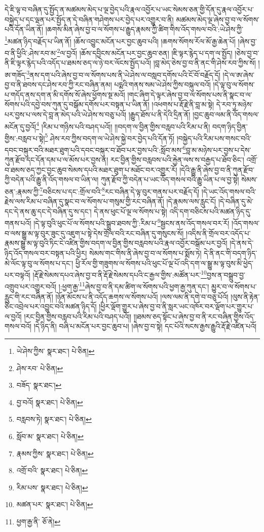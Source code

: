 དེ་ཇི་ལྟ་བ་བཞིན་དུ་སྤྱོད་ན་མཚམས་མེད་པ་ལྔ་བྱེད་པའི་རྣལ་འབྱོར་པ་ཡང་སེམས་ཅན་གྱི་དོན་དུ་རྣལ་འབྱོར་པ་བསྐྱེད་པ་དང་ལྡན་པར་སྤྱོད་ན་དེ་བཞིན་གཤེགས་པར་བྱེད་པར་འགྱུར་བ་ནི། མཚམས་མེད་ལྔ་ཞེས་བྱ་བ་ལ་སོགས་པའི་དོན་ཡིན་ནོ། །ཆགས་མིན་ཞེས་བྱ་བ་ལ་སོགས་པ་རྒྱུད་རྣམས་ཀྱི་ཚིག་གིས་འོད་གསལ་བའི་:ཡེ་ཤེས་ཀྱི་\footnote{ཡེ་ཤེས་ཀྱིས་  སྣར་ཐང་།  པེ་ཅིན། }མཚན་ཉིད་བརྗོད་པ་ཡིན་ནོ། །ཆོས་འབྱུང་མངོན་པར་བྱང་ཆུབ་པའི། །ཆགས་སོགས་རོལ་མོ་རྒྱ་ཆེན་པོ། །ཞེས་བྱ་བ་ནི་ཕྱིའི་:ཤེས་རབ་མ་\footnote{ཤེས་རབ་  པེ་ཅིན། }ལ་བྱའོ། །ཆོས་དབྱིངས་མངོན་པར་བྱང་ཆུབ་ཅན། །ཇི་ལྟར་རྙེད་པ་དག་ལ་སྤྱོད། །ཅེས་བྱ་བ་ནི་ཇི་ལྟར་རྙེད་པའི་འདོད་པ་ཐམས་ཅད་ལ་ཉེ་བར་ལོངས་སྤྱོད་པའོ། །བླ་མེད་ཅེས་བྱ་བ་ནི་ནང་གི་ཤེས་རབ་ཀྱིས་སོ། །ཨ་གཟོད་\footnote{བཟོད་  སྣར་ཐང་། }ནས་དག་པའི་ཞེས་བྱ་བ་ལ་སོགས་པས་ནི་ཡེ་ཤེས་ལ་བསླབ་དགོས་པའི་ངོ་བོ་བརྗོད་དོ། །དེ་ལ་ཨ་ཞེས་བྱ་བ་ནི་ཐབས་དང་ཤེས་རབ་ཀྱི་རང་བཞིན་ནམ། པདྨའི་གནས་སམ་ཡེ་ཤེས་ཀྱིས་བསྐུལ་བའོ། །དེ་ལྟ་བུ་ལ་སོགས་པ་གདོད་ནས་དག་ན་མི་དགོས་སོ་ཞེས་ཕྱོགས་སྔ་མའོ། །གང་ཞིག་དེ་ལྟར་ཞེས་བྱ་བ་ལ་སོགས་པས་ནི་སྣང་བ་ལ་སོགས་པའི་དབྱེ་བས་ཀུན་དུ་བསྒོམ་དགོས་པར་བསྟན་པ་ཡིན་ནོ། །འཕགས་པ་རྡོ་རྗེ་ནི་བླ་མ་སྟེ། དེ་རབ་ཏུ་མཉེས་པར་བྱས་པ་ལས་དེ་བླ་ན་མེད་པའི་ཡེ་ཤེས་ས་བཅུ་པའོ། །རྒྱུད་ཐོས་པ་ནི་དེའི་དྲིན་ནོ། །བྱང་ཆུབ་ལམ་ནི་འོད་གསལ་མངོན་དུ་བྱའོ།\footnote{བྱ་བའོ།  སྣར་ཐང་།  པེ་ཅིན། } །རིམ་པ་གཉིས་པའི་བཤད་པའོ།། །།བདག་ལ་བྱིན་གྱིས་བརླབ་པའི་རིམ་པ་ནི། བདག་ཉིད་བྱིན་གྱིས་:བརླབ་པ་སྟེ།\footnote{བརླབས་ཏེ།  སྣར་ཐང་།  པེ་ཅིན། } ཤེས་རབ་ཀྱིས་བདག་ལ་ཡེ་ཤེས་སྐྱེ་བར་བྱེད་པའི་དོན་ཏོ། །བསྐྱེད་པའི་རིམ་པས་གསང་བའི་དབང་བསྐུར་བའི་མཐར་ཐུག་པའི་དབང་བསྐུར་བ་ཐོབ་པར་བྱས་པའི་:སློབ་མས་\footnote{སློབ་མ་  སྣར་ཐང་།  པེ་ཅིན། }བླ་མ་མཉེས་པར་བྱས་པ་དེས་ཀུན་རྫོབ་དང་དོན་དམ་པ་ལ་མོས་པར་བྱས་ན། རང་བྱིན་གྱིས་བརླབས་པའི་རྐྱེན་ལས་ས་བརྒྱད་པ་ཐོབ་ཅིང་། འགྲོ་བ་ཐམས་ཅད་ཀྱང་བྱང་ཆུབ་སེམས་དཔའི་མཐར་ཐུག་པ་མཐོང་བར་འགྱུར་རོ། །དེའི་རྒྱུ་ནི་ཞེས་བྱ་བ་ནི་ཀུན་རྫོབ་ཀྱི་བདེན་པའི་རྒྱུ་ནི་འོད་གསལ་བ་ཡིན་ལ། ཀུན་རྫོབ་ཀྱི་བདེན་པ་ཡང་འོད་གསལ་བའི་རྒྱུ་ཡིན་པ་ལ་བྱ་སྟེ། སེམས་ཅན་:རྣམས་ཀྱི་\footnote{རྣམས་ཀྱིས་  སྣར་ཐང་།  པེ་ཅིན། }བཅིངས་པ་དང་:གྲོལ་བའི་\footnote{འགྲོ་བའི་  སྣར་ཐང་།  པེ་ཅིན། }རང་བཞིན་དེ་ལྟ་བུར་གནས་པར་བརྗོད་དོ། །དེ་ཡང་འོད་གསལ་བའི་རྗེས་ལས་རིམ་པ་བཞིན་དུ་སྣང་བ་ལ་སོགས་པ་གསུམ་གྱི་རང་བཞིན་ནོ། །དེ་རྣམས་ལས་རླུང་ངོ། །དེ་བཞིན་དུ་མེ་དང་དེ་ནས་ཆུ་དང་དེ་བཞིན་དུ་ས་དང་། དེ་ནས་ཕུང་པོ་ལྔ་ལ་སོགས་པ་སྟེ། འདི་དག་བཅིངས་པའི་མཚན་ཉིད་དུ་གནས་པའོ། །དེ་ལྟ་བུའི་ཕུང་པོ་ལ་སོགས་པའི་སྒྲུབ་ཐབས་ཀྱི་:རིམ་པ་\footnote{རིམ་པས་  སྣར་ཐང་།  པེ་ཅིན། }སྦྱངས་ནས་འོད་གསལ་བར་རོ། །འོད་གསལ་བ་ལས་སྒྱུ་མ་ལྟ་བུར་ཟུང་དུ་འཇུག་པ་སྟེ་དེས་གྲོལ་བའི་རང་བཞིན་དུ་གསུངས་སོ། །འདིས་ནི་གྲོལ་བར་འདོད་པ་རྣམས་སྒྱུ་མ་ལྟ་བུའི་ཏིང་ངེ་འཛིན་གྱིས་བདག་ལ་བྱིན་གྱིས་བརླབས་པའི་རྣལ་འབྱོར་བསྒོམ་པར་བྱའོ། །དེ་ནས་དེ་ཉིད་འོད་གསལ་བར་བསྟན་པའི་ཕྱིར། སེམས་གང་གིས་ནི་ཞེས་བྱ་བ་ལ་སོགས་པ་སྨོས་ཏེ། དེ་ནི་ནང་གི་བདག་ཉིད་མེ་ལོང་ལྟ་བུ་ལ་སོགས་པ་དང་། ཕྱི་རོལ་གྱི་གཟུགས་ལ་སོགས་པའི་ཕུང་པོ་ལྔ་པོ་འདི་དག་ལ་སྒྱུ་མ་ལྟ་བུས་མི་ཕྱེད་པར་བལྟའོ། །རྡོ་རྗེ་སེམས་དཔའ་ཞེས་བྱ་བ་ནི་རྡོ་རྗེ་སེམས་དཔའི་ང་རྒྱལ་གྱིས་:མཚོན་པར་\footnote{མཚན་པར་  སྣར་ཐང་།  པེ་ཅིན། }བྱས་ན་བསྒྲུབ་བྱ་འགྲུབ་པར་འགྱུར་བའོ། །:ཕྱག་རྒྱ་\footnote{ཕྱག་རྒྱ་ནི་  ཅོ་ནེ། }ཞེས་བྱ་བ་ནི་དམ་ཚིག་ལ་སོགས་པའི་ཕྱག་རྒྱ་ཀུན་དང་། མྱུར་བ་ལ་སོགས་པ་རླུང་གི་རང་བཞིན་ནོ། །ཉོན་མོངས་པ་ནི་འདོད་ཆགས་ལ་སོགས་པའོ། །ལས་ལམ་ནི་དགེ་བ་བཅུ་པོའོ། །ལུས་ནི་རྟེན་ཅིང་འབྲེལ་པར་འབྱུང་བའི་མཚན་ཉིད་དོ། །ཕྱིར་ལྡོག་གྱུར་པ་ཞེས་བྱ་བ་ནི་སླར་ཡང་འཁོར་བར་ལྡོག་པར་གྱུར་པ་ལ་བྱའོ། །རང་བྱིན་གྱིས་བརླབ་པའི་རིམ་པའི་བཤད་པའོ།། །།ཐམས་ཅད་སྟོང་པ་ཞེས་བྱ་བ་ནི་རང་བཞིན་གྱིས་འོད་གསལ་བའོ། །དེ་ཉིད་ནི། བཞི་པ་མངོན་པར་བྱང་ཆུབ་པ། །ཞེས་བྱ་བ་སྟེ། དང་པོའི་སངས་རྒྱས་རྒྱུའི་རྡོ་རྗེ་འཛིན་པའོ། 